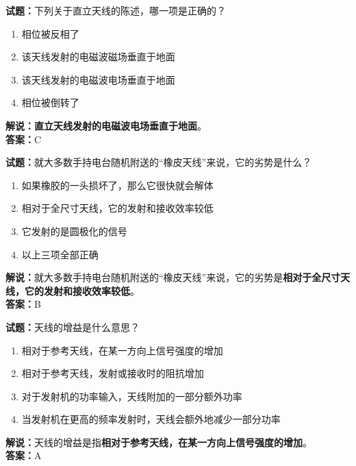 \documentclass{ctexbook}
\begin{document}
\bigskip

\noindent\textbf{试题：}下列关于直立天线的陈述，哪一项是正确的？

\begin{enumerate}[leftmargin=3em]
  \item 相位被反相了
  \item 该天线发射的电磁波磁场垂直于地面
  \item 该天线发射的电磁波电场垂直于地面
  \item 相位被倒转了
\end{enumerate}

\noindent\textbf{解说：}\textbf{直立天线发射的电磁波电场垂直于地面}。\\\noindent\textbf{答案：}C

\bigskip

\noindent\textbf{试题：}就大多数手持电台随机附送的“橡皮天线”来说，它的劣势是什么？

\begin{enumerate}[leftmargin=3em]
  \item 如果橡胶的一头损坏了，那么它很快就会解体
  \item 相对于全尺寸天线，它的发射和接收效率较低
  \item 它发射的是圆极化的信号
  \item 以上三项全部正确
\end{enumerate}

\noindent\textbf{解说：}就大多数手持电台随机附送的“橡皮天线”来说，它的劣势是\textbf{相对于全尺寸天线，它的发射和接收效率较低}。\\\noindent\textbf{答案：}B

\bigskip

\noindent\textbf{试题：}天线的增益是什么意思？

\begin{enumerate}[leftmargin=3em]
  \item 相对于参考天线，在某一方向上信号强度的增加
  \item 相对于参考天线，发射或接收时的阻抗增加
  \item 对于发射机的功率输入，天线附加的一部分额外功率
  \item 当发射机在更高的频率发射时，天线会额外地减少一部分功率
\end{enumerate}

\noindent\textbf{解说：}天线的增益是指\textbf{相对于参考天线，在某一方向上信号强度的增加}。\\\noindent\textbf{答案：}A

\bigskip
\end{document}
